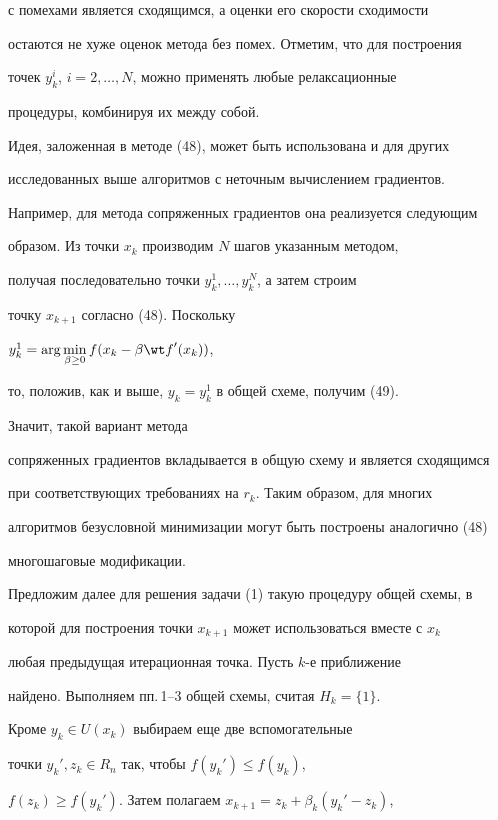 с помехами является сходящимся, а оценки его скорости сходимости


остаются не хуже оценок метода без помех. Отметим, что для построения


точек $y_k^i$, $i=2,\dotsc,N$, можно применять любые релаксационные


процедуры, комбинируя их между собой.





Идея, заложенная в методе (48), может быть использована и для других


исследованных выше алгоритмов с неточным вычислением градиентов.


Например, для метода сопряженных градиентов она реализуется следующим


образом. Из точки $x_k$ производим $N$ шагов указанным методом,


получая последовательно точки $y_k^1,\dotsc,y_k^{N}$, а затем строим


точку $x_{k+1}$ согласно (48). Поскольку


$y_k^1=\arg\min\limits_{\beta\ge 0}f(x_k-\beta {\wt f}'(x_k))$,


то, положив, как и выше, $y_k=y_k^1$ в общей схеме, получим (49).


Значит, такой вариант метода


сопряженных градиентов вкладывается в общую схему и является сходящимся


при соответствующих требованиях на $r_k$. Таким образом, для многих


алгоритмов безусловной минимизации могут быть построены аналогично (48)


многошаговые модификации.





Предложим далее для решения задачи (1) такую процедуру общей схемы, в


которой для построения точки $x_{k+1}$ может использоваться вместе с $x_k$


любая предыдущая итерационная точка. Пусть $k$-е приближение


найдено. Выполняем пп.\,1--3 общей схемы, считая $H_k=\{1\}$.


Кроме $y_k\in U(x_k)$ выбираем еще две вспомогательные


точки ${y_k}', z_k\in R_n$ так, чтобы $f({y_k}')\le f(y_k)$,


$f(z_k)\ge f({y_k}')$. Затем полагаем $x_{k+1}=z_k+\beta_k({y_k}'-z_k)$,


